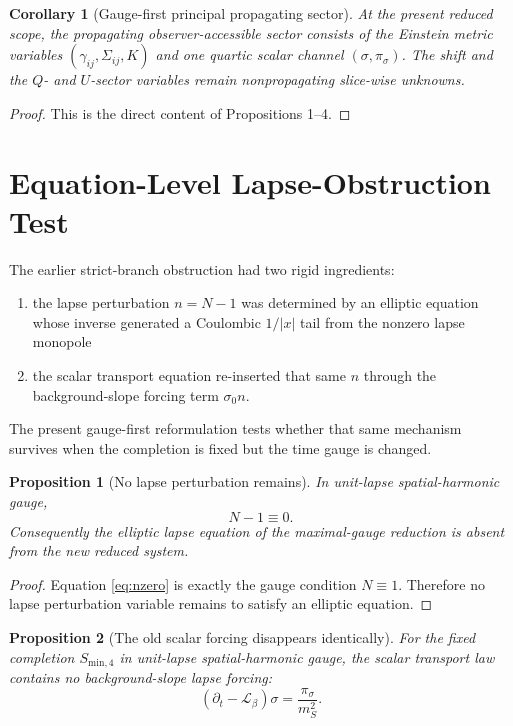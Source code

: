 \documentclass[11pt]{article}
\newcommand{\Ell}{\mathcal{L}}
\newtheorem{proposition}{Proposition}
\newtheorem{corollary}{Corollary}
\begin{document}
\begin{corollary}[Gauge-first principal propagating sector]
At the present reduced scope, the propagating observer-accessible sector consists of the Einstein metric variables \((\gamma_{ij},\Sigma_{ij},K)\) and one quartic scalar channel \((\sigma,\pi_\sigma)\). The shift and the \(Q\)- and \(U\)-sector variables remain nonpropagating slice-wise unknowns.
\end{corollary}

\begin{proof}
This is the direct content of Propositions 1--4.
\end{proof}

\section{Equation-Level Lapse-Obstruction Test}

The earlier strict-branch obstruction had two rigid ingredients:
\begin{enumerate}
    \item the lapse perturbation \(n=N-1\) was determined by an elliptic equation whose inverse generated a Coulombic \(1/|x|\) tail from the nonzero lapse monopole
    \item the scalar transport equation re-inserted that same \(n\) through the background-slope forcing term \(\sigma_0 n\).
\end{enumerate}
The present gauge-first reformulation tests whether that same mechanism survives when the completion is fixed but the time gauge is changed.

\begin{proposition}[No lapse perturbation remains]
In unit-lapse spatial-harmonic gauge,
\begin{equation}
N-1\equiv 0.
\label{eq:nzero}
\end{equation}
Consequently the elliptic lapse equation of the maximal-gauge reduction is absent from the new reduced system.
\end{proposition}

\begin{proof}
Equation \eqref{eq:nzero} is exactly the gauge condition \(N\equiv 1\). Therefore no lapse perturbation variable remains to satisfy an elliptic equation.
\end{proof}

\begin{proposition}[The old scalar forcing disappears identically]
For the fixed completion \(S_{\mathrm{min},4}\) in unit-lapse spatial-harmonic gauge, the scalar transport law contains no background-slope lapse forcing:
\begin{equation}
(\partial_t-\Ell_\beta)\sigma
=
\frac{\pi_\sigma}{m_S^2}.
\label{eq:noforce}
\end{equation}
\end{proposition}
\end{document}
